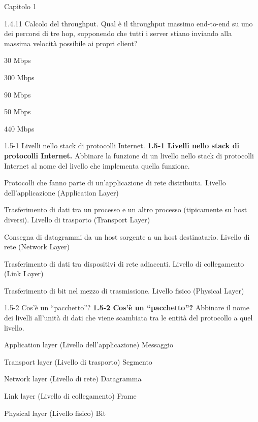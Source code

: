 \documentclass[a4paper]{article}
\begin{document}
\begin{quiz}{Capitolo 1}
\begin{multi}[points=1,shuffle=true]{1.4.11 Calcolo del throughput.}
Qual è il throughput massimo end-to-end su uno dei percorsi di tre hop, supponendo che tutti i server stiano inviando alla massima velocità possibile ai propri client?
\item* 30 Mbps
\item 300 Mbps
\item 90 Mbps
\item 50 Mbps
\item 440 Mbps
\end{multi}


\begin{matching}[points=1,shuffle=true]{1.5-1 Livelli nello stack di protocolli Internet.}
\textbf{1.5-1 Livelli nello stack di protocolli Internet.}
Abbinare la funzione di un livello nello stack di protocolli Internet al nome del livello che implementa quella funzione.

\item Protocolli che fanno parte di un'applicazione di rete distribuita. \answer Livello dell'applicazione (Application Layer)
\item Trasferimento di dati tra un processo e un altro processo (tipicamente su host diversi). \answer Livello di trasporto (Transport Layer)
\item Consegna di datagrammi da un host sorgente a un host destinatario. \answer Livello di rete (Network Layer)
\item Trasferimento di dati tra dispositivi di rete adiacenti. \answer Livello di collegamento (Link Layer)
\item Trasferimento di bit nel mezzo di trasmissione. \answer Livello fisico (Physical Layer)
\end{matching}

\begin{matching}[points=1,shuffle=true]{1.5-2 Cos'è un ``pacchetto''?}
\textbf{1.5-2 Cos'è un ``pacchetto''?}
Abbinare il nome dei livelli all'unità di dati che viene scambiata tra le entità del protocollo a quel livello.

\item Application layer (Livello dell'applicazione) \answer Messaggio
\item Transport layer (Livello di trasporto) \answer Segmento
\item Network layer (Livello di rete) \answer Datagramma
\item Link layer (Livello di collegamento) \answer Frame
\item Physical layer (Livello fisico) \answer Bit
\end{matching}


\end{quiz}
\end{document}
